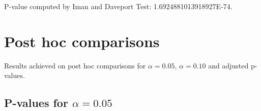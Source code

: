 \documentclass[a4paper,10pt]{article}
\begin{document}
\begin{landscape}
P-value computed by Iman and Daveport Test: 1.6924881013918927E-74.\newline



\pagebreak

\section{Post hoc comparisons}

Results achieved on post hoc comparisons for $\alpha = 0.05$, $\alpha = 0.10$ and adjusted p-values.

\subsection{P-values for $\alpha=0.05$}


\end{landscape}
\end{document}

